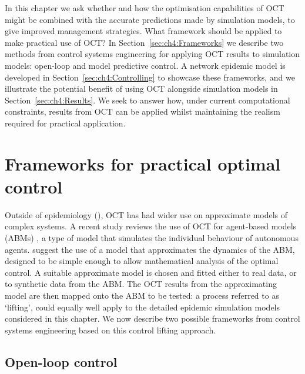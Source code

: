 In this chapter we ask whether and how the optimisation capabilities of OCT might be combined with the accurate predictions made by simulation models, to give improved management strategies. What framework should be applied to make practical use of OCT? In Section~\ref{sec:ch4:Frameworks} we describe two methods from control systems engineering for applying OCT results to simulation models: open-loop and model predictive control. A network epidemic model is developed in Section~\ref{sec:ch4:Controlling} to showcase these frameworks, and we illustrate the potential benefit of using OCT alongside simulation models in Section~\ref{sec:ch4:Results}. We seek to answer how, under current computational constraints, results from OCT can be applied whilst maintaining the realism required for practical application.


\section{Frameworks for practical optimal control\label{sec:ch4:Frameworks}}

Outside of epidemiology (), OCT has had wider use on approximate models of complex systems. A recent study reviews the use of OCT for agent-based models (ABMs) \citep{an_optimization_2017}, a type of model that simulates the individual behaviour of autonomous agents. \citet{an_optimization_2017} suggest the use of a model that approximates the dynamics of the ABM, designed to be simple enough to allow mathematical analysis of the optimal control. A suitable approximate model is chosen and fitted either to real data, or to synthetic data from the ABM\@. The OCT results from the approximating model are then mapped onto the ABM to be tested: a process referred to as `lifting',  could equally well apply to the detailed epidemic simulation models considered in this chapter. We now describe two possible frameworks from control systems engineering based on this control lifting approach.

\subsection{Open-loop control}

